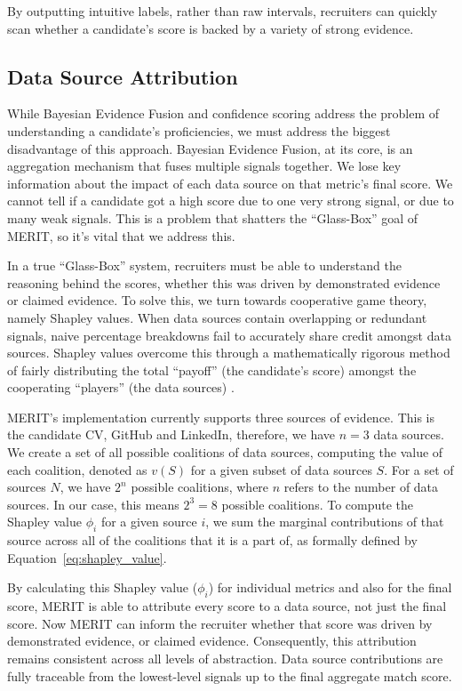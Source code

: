 By outputting intuitive labels, rather than raw intervals, recruiters can quickly scan whether a candidate's score is
backed by a variety of strong evidence.


\subsection{Data Source Attribution}
While Bayesian Evidence Fusion and confidence scoring address the problem of understanding a candidate's proficiencies, we must address
the biggest disadvantage of this approach. Bayesian Evidence Fusion, at its core, is an aggregation mechanism that fuses multiple signals
together. We lose key information about the impact of each data source on that metric's final score. We cannot tell if a candidate got a high
score due to one very strong signal, or due to many weak signals. This is a problem that shatters the ``Glass-Box'' goal of MERIT, so it's vital
that we address this.

In a true ``Glass-Box'' system, recruiters must be able to understand the reasoning behind the scores, whether this was driven by demonstrated
evidence or claimed evidence. To solve this, we turn towards cooperative game theory, namely Shapley values. When data sources contain
overlapping or redundant signals, naive percentage breakdowns fail to accurately share credit amongst data sources. Shapley values
overcome this through a mathematically rigorous method of fairly distributing the total ``payoff'' (the candidate's score) amongst the
cooperating ``players'' (the data sources) \cite{shapley1953, lundberg2017unified}.

MERIT's implementation currently supports three sources of evidence. This is the candidate CV, GitHub and LinkedIn, therefore, we 
have $n = 3$ data sources. We create a set of all possible coalitions of data sources, computing the value of each coalition, 
denoted as $v(S)$ for a given subset of data sources $S$. For a set of sources $N$, we have $2^n$ possible coalitions, where $n$
refers to the number of data sources. In our case, this means $2^3 = 8$ possible coalitions. To compute the Shapley value $\phi_i$
for a given source $i$, we sum the marginal contributions of that source across all of the coalitions that it is a part of, as formally defined by Equation~\ref{eq:shapley_value}.

By calculating this Shapley value ($\phi_i$) for individual metrics and also for the final score, MERIT is able to attribute every score
to a data source, not just the final score. Now MERIT can inform the recruiter whether that score was driven by demonstrated evidence, or claimed evidence. Consequently,
this attribution remains consistent across all levels of abstraction. Data source contributions are fully traceable from the lowest-level 
signals up to the final aggregate match score.

